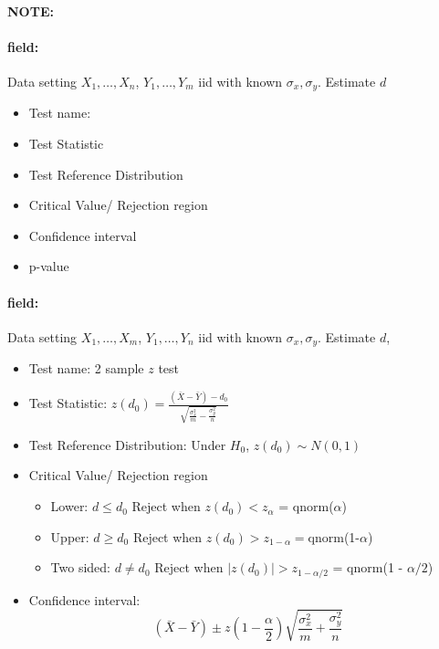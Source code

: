 \documentclass[12pt]{article}
\newenvironment{note}{\paragraph{NOTE:}}{}
\newenvironment{field}{\paragraph{field:}}{}
\begin{document}
\begin{note}
 \begin{field}
  Data setting $X_1, \ldots , X_n$, $Y_1, \ldots, Y_m$ iid with known $\sigma_x, \sigma_y$. Estimate $d$
  \begin{itemize}
   \item Test name:
   \item Test Statistic
   \item Test Reference Distribution
   \item Critical Value/ Rejection region
   \item Confidence interval
   \item p-value
  \end{itemize}
 \end{field}
 \begin{field}
  Data setting $X_1, \ldots , X_m$, $Y_1, \ldots, Y_n$ iid with known $\sigma_x, \sigma_y$. Estimate $d$,
  \begin{itemize}
   \item Test name: 2 sample $z$ test
   \item Test Statistic: $z(d_0) = \frac{(\bar{X}- \bar{Y}) - d_0}{\sqrt{\frac{\sigma_x^2}{m} - \frac{\sigma_y^2}{n}}}$
   \item Test Reference Distribution: Under $H_0$, $z(d_0) \sim N(0,1)$
   \item Critical Value/ Rejection region
         \begin{itemize}
          \item Lower: $d \leq d_0$ Reject when $z(d_0) < z_{\alpha}$ = qnorm($\alpha$)
          \item Upper: $d \geq d_0$ Reject when $z(d_0) > z_{1 - \alpha} = $qnorm(1-$\alpha$)
          \item Two sided: $d \neq d_0$ Reject when $|z(d_0)| > z_{1 - \alpha/2}$ = qnorm(1 - $\alpha/2$)
         \end{itemize}
   \item Confidence interval: $$ (\bar{X} - \bar{Y}) \pm z(1 - \frac{\alpha}{2})\sqrt{\frac{\sigma_x^2}{m} + \frac{\sigma_y^2}{n}} $$
  \end{itemize}
 \end{field}
\end{note}
\end{document}
